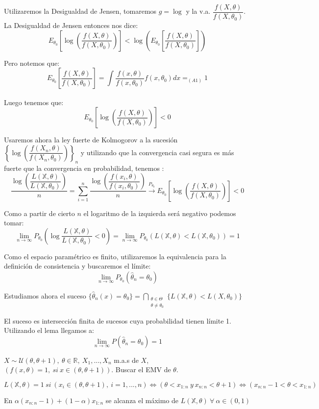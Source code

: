 \documentclass[openany]{book}
\begin{document}
\begin{demonstration}
    Utilizaremos la Desigualdad de Jensen, tomaremos $ g = \log{} $ y la v.a. $ \dfrac{f(X,\theta)}{f(X,\theta_0)} $. La Desigualdad de Jensen entonces nos dice:
    $$ E_{\theta_0}\left[\log{\left(\dfrac{f(X,\theta)}{f(X,\theta_0)}\right)}\right] < \log{\left(  E_{\theta_0}\left[\dfrac{f(X,\theta)}{f(X,\theta_0)}\right]\right)} $$

    Pero notemos que:
    $$   E_{\theta_0}\left[\dfrac{f(X,\theta)}{f(X,\theta_0)}\right] = \int\limits_{}^{} \dfrac{f(x,\theta)}{f(x,\theta_0)}f(x,\theta_0)dx =_{(A1)} 1 $$

    Luego tenemos que:
    $$ E_{\theta_0}\left[\log{\left(\dfrac{f(X,\theta)}{f(X,\theta_0)}\right)}\right] < 0 $$

    Usaremos ahora la ley fuerte de Kolmogorov a la sucesión $ \left\{\log{\left(  \dfrac{f(X_n,\theta)}{f(X_n,\theta_0)}\right)}\right\}_{n} $ y utilizando que la convergencia casi segura es más fuerte que la convergencia en probabilidad, tenemos :
    $$\dfrac{\log{\left( \dfrac{L(\mathbb{X},\theta)}{L(\mathbb{X},\theta_0)} \right)}}{n} =  \sum\limits_{i=1}^{n} \dfrac{\log{\left( \dfrac{f(x_i,\theta)}{f(x_i,\theta_0)} \right)}}{n} \xrightarrow{P_{\theta_0}} E_{\theta_0}\left[\log{\left(\dfrac{f(X,\theta)}{f(X,\theta_0)}\right)}\right] < 0 $$

    Como a partir de cierto $ n $ el logaritmo de la izquierda será negativo podemos tomar:
    $$ \lim_{n \to \infty}P_{\theta_0} \left( \log{ \dfrac{L(\mathbb{X},\theta)}{L(\mathbb{X},\theta_0  )}}<0 \right) = \lim_{n \to \infty}P_{\theta_0} (L(\mathbb{X},\theta)<L(\mathbb{X},\theta_0)) = 1$$

    Como el espacio paramétrico es finito, utilizaremos la equivalencia para la definición de consistencia y buscaremos el límite:
    $$ \lim_{n \to \infty} P_{\theta_0}(\hat{\theta}_{n} = \theta_0 ) $$

    Estudiamos ahora el suceso $ \{\hat{\theta}_{n}(x) = \theta_0\} = \bigcap _{\substack{\theta \in \Theta\\\theta\ne \theta_0}} \{L(\mathbb{X},\theta) < L(X,\theta_0)\} $

    El suceso es intersección finita de sucesos cuya probabilidad tienen límite 1. Utilizando el lema llegamos a:
    $$ \lim_{n \to \infty}P(\hat{\theta}_{n} = \theta_0 ) = 1 $$
\end{demonstration}


\begin{example}
    $ X \sim \mathcal{U}(\theta,\theta+1),\ \theta \in \mathbb{R},\ X_1,...,X_n$ m.a.s de $ X $, $ (f(x,\theta) = 1,\ si\ x \in (\theta,\theta+1)) $. Buscar el EMV de $ \theta $.

    $$ L(\mathbb{X},\theta) = 1\ si\ (x_i \in (\theta,\theta+1),\ i = 1,...,n) \iff (\theta < x_{1:n}\ y\ x_{n:n}< \theta+1) \iff (x_{n:n}-1 < \theta < x_{1:n}) $$

    En $ \alpha (x_{n:n}-1)+(1-\alpha)x_{1:n} $ se alcanza el máximo de $ L(\mathbb{X},\theta)\ \forall\ \alpha \in (0,1) $
\end{example}
\end{document}
